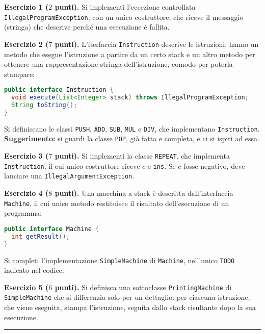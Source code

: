 \documentclass[12pt]{article}
\begin{document}
\vspace*{2ex}\textbf{Esercizio 1 ($2$ punti).}
Si implementi l'eccezione controllata \texttt{IllegalProgramException}, con un unico costruttore,
che riceve il messaggio (stringa) che descrive perch\'e una esecuzione \`e fallita.

\vspace*{2ex}\textbf{Esercizio 2 ($7$ punti).}
L'iterfaccia \texttt{Instruction} descrive le istruzioni: hanno un metodo
che esegue l'istruzione a partire da un certo stack e un altro metodo per ottenere una
rappresentazione stringa dell'istruzione, comodo per poterla stampare:

\begin{lstlisting}[language=Java]
public interface Instruction {
  void execute(List<Integer> stack) throws IllegalProgramException;
  String toString();
}
\end{lstlisting}
%
Si definiscano le classi \texttt{PUSH}, \texttt{ADD}, \texttt{SUB},
\texttt{MUL} e \texttt{DIV}, che implementano \texttt{Instruction}.
\textbf{Suggerimento: } si guardi la classe \texttt{POP}, gi\`a fatta
e completa, e ci si ispiri ad essa.

\vspace*{2ex}\textbf{Esercizio 3 ($7$ punti).}
Si implementi la classe \texttt{REPEAT}, che implementa \texttt{Instruction},
il cui unico costruttore riceve $c$ e \texttt{ins}. Se $c$
fosse negativo, deve lanciare una
\texttt{IllegalArgumentException}.

\vspace*{2ex}\textbf{Esercizio 4 ($8$ punti).}
Una macchina a stack \`e descritta dall'interfaccia
\texttt{Machine}, il cui unico metodo restituisce il risultato dell'esecuzione
di un programma:
%
\begin{lstlisting}[language=Java]
public interface Machine {
  int getResult();
}
\end{lstlisting}
%
Si completi l'implementazione \texttt{SimpleMachine} di \texttt{Machine},
nell'unico \texttt{TODO} indicato nel codice.

\vspace*{2ex}\textbf{Esercizio 5 ($6$ punti).}
Si definisca una sottoclasse \texttt{PrintingMachine} di
\texttt{SimpleMachine} che si differenzia solo per un dettaglio:
per ciascuna istruzione, che viene eseguita, stampa l'istruzione, seguita
dallo stack risultante dopo la sua esecuzione.

\vspace*{2ex}
\hrule
\vspace*{2ex}
\end{document}
